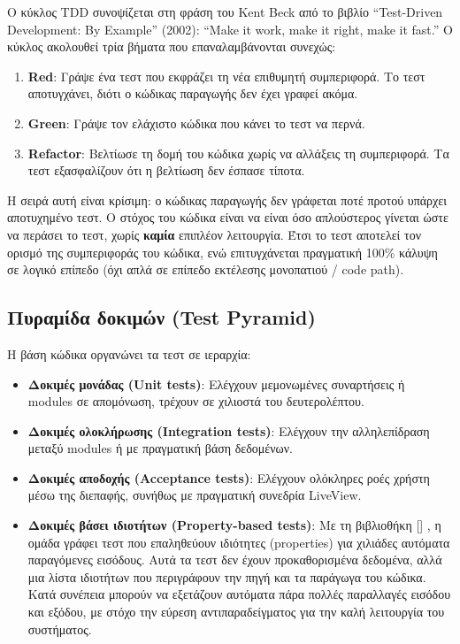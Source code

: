 \documentclass[11pt,a4paper,greek,twoside]{template-xe}
\let\origtexttt\texttt
\renewcommand{\texttt}[1]{%
  \begingroup
  \StrSubstitute{#1}{.}{.\allowbreak}[\tttmp]%
  \origtexttt{\tttmp}%
  \endgroup
}
\providecommand{\tightlist}{\setlength{\itemsep}{0pt}\setlength{\parskip}{0pt}}
\begin{document}
Ο κύκλος TDD συνοψίζεται στη φράση του Kent Beck από το βιβλίο
``Test-Driven Development: By Example'' (2002): ``Make it work, make it
right, make it fast.'' Ο κύκλος ακολουθεί τρία βήματα που
επαναλαμβάνονται συνεχώς:

\begin{enumerate}
\def\labelenumi{\arabic{enumi}.}
\tightlist
\item
  \textbf{Red}: Γράψε ένα τεστ που εκφράζει τη νέα επιθυμητή
  συμπεριφορά. Το τεστ αποτυγχάνει, διότι ο κώδικας παραγωγής δεν έχει
  γραφεί ακόμα.
\item
  \textbf{Green}: Γράψε τον ελάχιστο κώδικα που κάνει το τεστ να περνά.
\item
  \textbf{Refactor}: Βελτίωσε τη δομή του κώδικα χωρίς να αλλάξεις τη
  συμπεριφορά. Τα τεστ εξασφαλίζουν ότι η βελτίωση δεν έσπασε τίποτα.
\end{enumerate}

Η σειρά αυτή είναι κρίσιμη: ο κώδικας παραγωγής δεν γράφεται ποτέ προτού
υπάρχει αποτυχημένο τεστ. Ο στόχος του κώδικα είναι να είναι όσο
απλούστερος γίνεται ώστε να περάσει το τεστ, χωρίς \textbf{καμία}
επιπλέον λειτουργία. Έτσι το τεστ αποτελεί τον ορισμό της συμπεριφοράς
του κώδικα, ενώ επιτυγχάνεται πραγματική 100\% κάλυψη σε λογικό επίπεδο
(όχι απλά σε επίπεδο εκτέλεσης μονοπατιού / code path).

\subsection{Πυραμίδα δοκιμών (Test
Pyramid)}\label{ux3c0ux3c5ux3c1ux3b1ux3bcux3afux3b4ux3b1-ux3b4ux3bfux3baux3b9ux3bcux3ceux3bd-test-pyramid}

Η βάση κώδικα οργανώνει τα τεστ σε ιεραρχία:

\begin{itemize}
\tightlist
\item
  \textbf{Δοκιμές μονάδας (Unit tests)}: Ελέγχουν μεμονωμένες
  συναρτήσεις ή modules σε απομόνωση, τρέχουν σε χιλιοστά του
  δευτερολέπτου.
\item
  \textbf{Δοκιμές ολοκλήρωσης (Integration tests)}: Ελέγχουν την
  αλληλεπίδραση μεταξύ modules ή με πραγματική βάση δεδομένων.
\item
  \textbf{Δοκιμές αποδοχής (Acceptance tests)}: Ελέγχουν ολόκληρες ροές
  χρήστη μέσω της διεπαφής, συνήθως με πραγματική συνεδρία LiveView.
\item
  \textbf{Δοκιμές βάσει ιδιοτήτων (Property-based tests)}: Με τη
  βιβλιοθήκη \texttt{ExUnitProperties}, η ομάδα γράφει τεστ που
  επαληθεύουν ιδιότητες (properties) για χιλιάδες αυτόματα παραγόμενες
  εισόδους. Αυτά τα τεστ δεν έχουν προκαθορισμένα δεδομένα, αλλά μια
  λίστα ιδιοτήτων που περιγράφουν την πηγή και τα παράγωγα του κώδικα.
  Κατά συνέπεια μπορούν να εξετάζουν αυτόματα πάρα πολλές παραλλαγές
  εισόδου και εξόδου, με στόχο την εύρεση αντιπαραδείγματος για την καλή
  λειτουργία του συστήματος.
\end{itemize}
\end{document}
